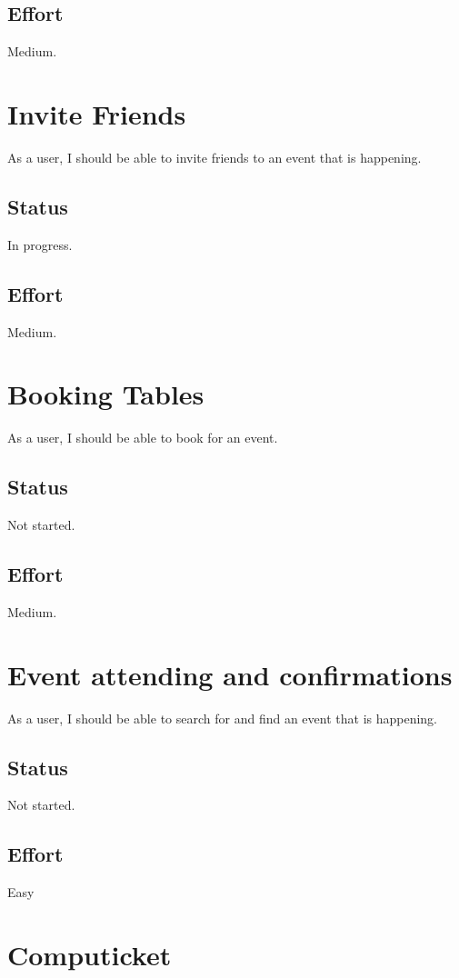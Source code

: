 \documentclass[10pt,a4paper]{article}
\begin{document}
\subsection{Effort}
Medium.

\section{Invite Friends}
As a user, I should be able to invite friends to an event that is happening.
\subsection{Status}
In progress.

\subsection{Effort}
Medium.

\section{Booking Tables}
As a user, I should be able to book for an event.
\subsection{Status}
Not started.

\subsection{Effort}
Medium.

\section{Event attending and confirmations}
As a user, I should be able to search for and find an event that is happening.
\subsection{Status}
Not started.

\subsection{Effort}
Easy

\section{Computicket}
\end{document}
